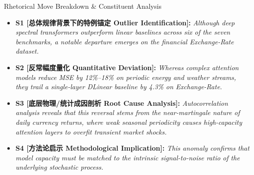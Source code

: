 \begin{TipBox}{Rhetorical Move Breakdown \& Constituent Analysis}
\begin{itemize}[leftmargin=1.5em]
  \item \textbf{S1 [总体规律背景下的特例锚定 Outlier Identification]:} \textit{Although deep spectral transformers outperform linear baselines across six of the seven benchmarks, a notable departure emerges on the financial Exchange-Rate dataset.}\par{}
  \item \textbf{S2 [反常幅度量化 Quantitative Deviation]:} \textit{Whereas complex attention models reduce MSE by 12\%--18\% on periodic energy and weather streams, they trail a single-layer DLinear baseline by 4.3\% on Exchange-Rate.}\par{}
  \item \textbf{S3 [底层物理/统计成因剖析 Root Cause Analysis]:} \textit{Autocorrelation analysis reveals that this reversal stems from the near-martingale nature of daily currency returns, where weak seasonal periodicity causes high-capacity attention layers to overfit transient market shocks.}\par{}
  \item \textbf{S4 [方法论启示 Methodological Implication]:} \textit{This anomaly confirms that model capacity must be matched to the intrinsic signal-to-noise ratio of the underlying stochastic process.}\par{}
\end{itemize}
\end{TipBox}
\medskip

